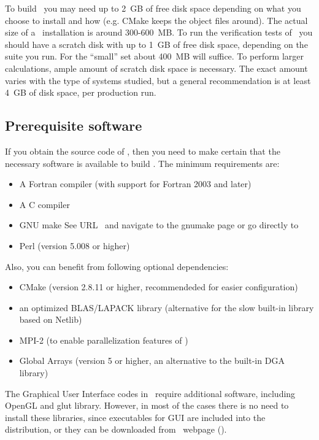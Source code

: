 To build \molcas\ you may need up to 2~GB of free disk space depending on
what you choose to install and how (e.g. CMake keeps the object files around).
The actual size of a \molcas\ installation is around 300-600~MB.
To run the verification tests of \molcas\ you should have a scratch disk
with up to 1~GB of free disk space, depending on the suite you run. For the
``small'' set about 400~MB will suffice.
To perform larger calculations, ample amount of scratch disk space is necessary.
The exact amount varies with the type of systems studied, but a general
recommendation is at least 4~GB of disk space, per production run.

\subsection{Prerequisite software}

If you obtain the source code of \molcas, then you need to
make certain that the necessary software is available to build \molcas.
The minimum requirements are:
\begin{itemize}
\item A Fortran compiler (with support for Fortran 2003 and later)
\item A C compiler
\item GNU make
  See URL \GnuWWW\ and navigate to the gnumake page or go directly
  to \GnuMakeWWW
\item Perl (version 5.008 or higher)
\end{itemize}

Also, you can benefit from following optional dependencies:
\begin{itemize}
\item CMake (version 2.8.11 or higher, recommendeded for easier configuration)
\item an optimized BLAS/LAPACK library (alternative for the slow built-in library based on Netlib)
\item MPI-2 (to enable parallelization features of \molcas)
\item Global Arrays (version 5 or higher, an alternative to the built-in DGA library)
\end{itemize}

The Graphical User Interface codes in \molcas\ require additional software,
including OpenGL and glut library. However, in most of the cases there is no need
to install these libraries, since executables for GUI are included into the
distribution, or they can be downloaded from \molcas\ webpage (\MolcasWWW).

